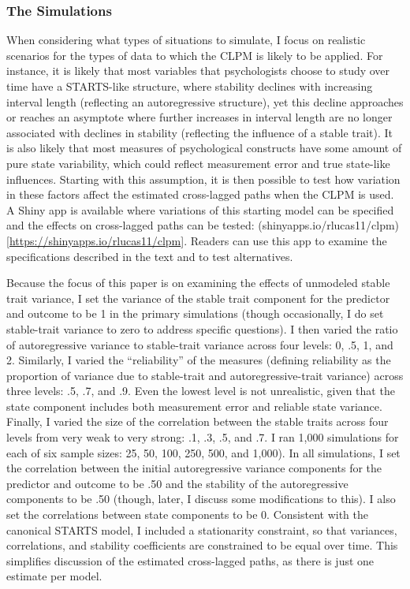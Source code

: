 \documentclass[
  english,
  man,floatsintext]{apa6}
\begin{document}
\hypertarget{the-simulations}{%
\subsubsection{The Simulations}\label{the-simulations}}

When considering what types of situations to simulate, I focus on realistic scenarios for the types of data to which the CLPM is likely to be applied. For instance, it is likely that most variables that psychologists choose to study over time have a STARTS-like structure, where stability declines with increasing interval length (reflecting an autoregressive structure), yet this decline approaches or reaches an asymptote where further increases in interval length are no longer associated with declines in stability (reflecting the influence of a stable trait). It is also likely that most measures of psychological constructs have some amount of pure state variability, which could reflect measurement error and true state-like influences. Starting with this assumption, it is then possible to test how variation in these factors affect the estimated cross-lagged paths when the CLPM is used. A Shiny app is available where variations of this starting model can be specified and the effects on cross-lagged paths can be tested: (shinyapps.io/rlucas11/clpm){[}\url{https://shinyapps.io/rlucas11/clpm}{]}. Readers can use this app to examine the specifications described in the text and to test alternatives.

Because the focus of this paper is on examining the effects of unmodeled stable trait variance, I set the variance of the stable trait component for the predictor and outcome to be 1 in the primary simulations (though occasionally, I do set stable-trait variance to zero to address specific questions). I then varied the ratio of autoregressive variance to stable-trait variance across four levels: 0, .5, 1, and 2. Similarly, I varied the ``reliability'' of the measures (defining reliability as the proportion of variance due to stable-trait and autoregressive-trait variance) across three levels: .5, .7, and .9. Even the lowest level is not unrealistic, given that the state component includes both measurement error and reliable state variance. Finally, I varied the size of the correlation between the stable traits across four levels from very weak to very strong: .1, .3, .5, and .7. I ran 1,000 simulations for each of six sample sizes: 25, 50, 100, 250, 500, and 1,000). In all simulations, I set the correlation between the initial autoregressive variance components for the predictor and outcome to be .50 and the stability of the autoregressive components to be .50 (though, later, I discuss some modifications to this). I also set the correlations between state components to be 0. Consistent with the canonical STARTS model, I included a stationarity constraint, so that variances, correlations, and stability coefficients are constrained to be equal over time. This simplifies discussion of the estimated cross-lagged paths, as there is just one estimate per model.
\end{document}
